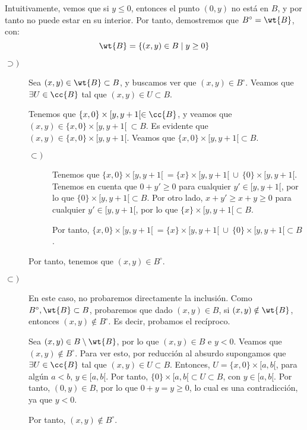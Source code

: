 \documentclass[12pt]{article}
\begin{document}
\begin{ejercicio}[4 puntos]
\begin{enumerate}
            Intuitivamente, vemos que si $y\leq 0$, entonces el punto $(0,y)$ no está en $B$, y por tanto no puede estar en su interior.
            Por tanto, demostremos que $B^{\circ} = \wt{B}$, con:
            \begin{equation*}
                \wt{B} = \{(x,y)\in B\mid y\geq 0\}
            \end{equation*}
            \begin{description}
                \item[$\supset)$] Sea $(x,y)\in \wt{B}\subset B$, y buscamos ver que $(x,y)\in B^{\circ}$.
                Veamos que $\exists U\in \cc{B}$ tal que $(x,y)\in U\subset B$.

                Tenemos que $\{x,0\}\times [y,y+1[\in \cc{B}$, y veamos que $(x,y)\in \{x,0\}\times [y,y+1[~\subset B$.
                Es evidente que $(x,y)\in \{x,0\}\times [y,y+1[$. Veamos que $\{x,0\}\times [y,y+1[\subset B$.
                \begin{description}
                    \item[$\subset)$] Tenemos que $\{x,0\}\times [y,y+1[~= \{x\}\times [y,y+1[~\cup~ \{0\}\times [y,y+1[$.
                    Tenemos en cuenta que $0+y'\geq 0$ para cualquier $y'\in [y,y+1[$, por lo que $\{0\}\times [y,y+1[\subset B$.
                    Por otro lado, $x+y'\geq x+y \geq 0$ para cualquier $y'\in [y,y+1[$, por lo que $\{x\}\times [y,y+1[\subset B$.

                    Por tanto, $\{x,0\}\times [y,y+1[~= \{x\}\times [y,y+1[~\cup~ \{0\}\times [y,y+1[\subset B$.
                \end{description}

                Por tanto, tenemos que $(x,y)\in B^{\circ}$.

                \item[$\subset)$] En este caso, no probaremos directamente la inclusión. Como $B^\circ,\wt{B} \subset B$, probaremos
                que dado $(x,y)\in B$, si $(x,y)\notin \wt{B}$, entonces $(x,y)\notin B^\circ$. Es decir, probamos el recíproco.
                
                Sea $(x,y)\in B\setminus \wt{B}$, por lo que $(x,y)\in B$ e $y<0$. Veamos que $(x,y)\notin B^\circ$.
                Para ver esto, por reducción al absurdo supongamos que $\exists U\in \cc{B}$ tal que $(x,y)\in U\subset B$.
                Entonces, $U=\{x,0\}\times [a,b[$, para algún $a<b$, $y\in [a,b[$. Por tanto, $\{0\}\times [a,b[\subset U\subset B$, con $y\in [a,b[$.
                Por tanto, $(0,y)\in B$, por lo que $0+y=y\geq 0$, lo cual es una contradicción, ya que $y<0$.

                Por tanto, $(x,y)\notin B^\circ$.
            \end{description}



        \end{enumerate}
        
    \end{ejercicio}
\end{document}
